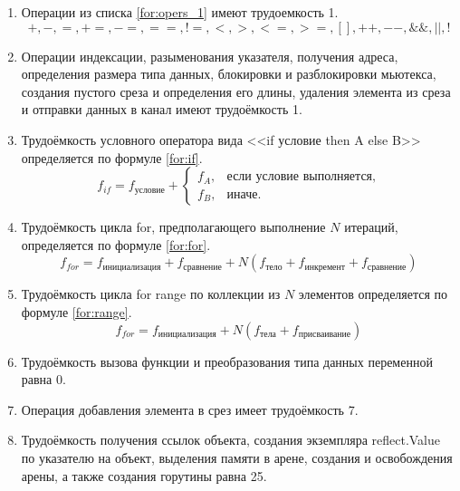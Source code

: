 \begin{enumerate}
	\item Операции из списка \ref{for:opers_1} имеют трудоемкость 1.
	\begin{equation}
		\label{for:opers_1}
		+, -, =, +=, -=, ==, !=, <, >, <=, >=, [], ++, {-}-, \&\&, ||, !
	\end{equation}

	\item Операции индексации, разыменования указателя, получения адреса, определения размера типа данных, блокировки и разблокировки мьютекса, создания пустого среза и определения его длины, удаления элемента из среза и отправки данных в канал имеют трудоёмкость 1.
	
	\item Трудоёмкость условного оператора вида <<if условие then A else B>> определяется по формуле \ref{for:if}.
	\begin{equation}
		\label{for:if}
		f_{if} = f_{\text{условие}} +
		\begin{cases}
			f_A, & \text{если условие выполняется,}\\
			f_B, & \text{иначе.}
		\end{cases}
	\end{equation}

	\item Трудоёмкость цикла for, предполагающего выполнение $N$ итераций, определяется по формуле \ref{for:for}.
	\begin{equation}
		\label{for:for}
		f_{for} = f_{\text{инициализация}} + f_{\text{сравнение}} + N(f_{\text{тело}} + f_{\text{инкремент}} + f_{\text{сравнение}})
	\end{equation}
	
	\item Трудоёмкость цикла for range по коллекции из $N$ элементов определяется по формуле \ref{for:range}.
	\begin{equation}
		\label{for:range}
		f_{for} = f_{\text{инициализация}} + N(f_{\text{тела}} + f_{\text{присваивание}})
	\end{equation}
	
	\item Трудоёмкость вызова функции и преобразования типа данных переменной равна 0.
	
	\item Операция добавления элемента в срез имеет трудоёмкость 7.
	
	\item Трудоёмкость получения ссылок объекта, создания экземпляра reflect.Value~\cite{golang_reflect} по указателю на объект, выделения памяти в арене, создания и освобождения арены, а также создания горутины равна 25.
\end{enumerate}


